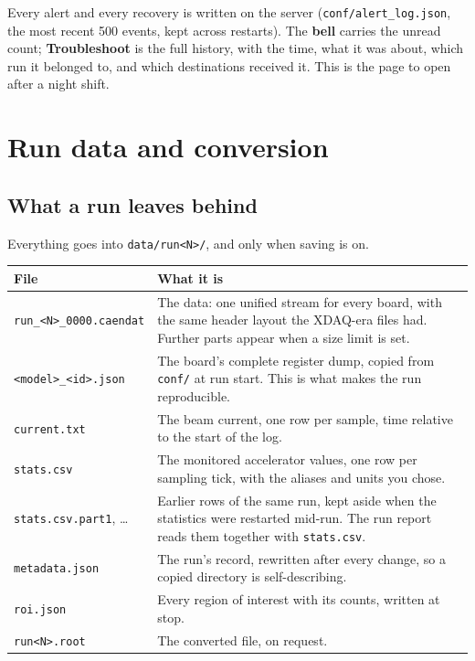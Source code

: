 \documentclass[11pt,a4paper]{report}
\newcommand{\ui}[1]{\textbf{#1}}          %
\newcommand{\file}[1]{\texttt{#1}}
\begin{document}
Every alert and every recovery is written on the server
(\file{conf/alert\_log.json}, the most recent 500 events, kept across restarts).
The \textbf{bell} carries the unread count; \ui{Troubleshoot} is the full history,
with the time, what it was about, which run it belonged to, and which destinations
received it. This is the page to open after a night shift.

\chapter{Run data and conversion}
\label{ch:rundata}

\section{What a run leaves behind}

Everything goes into \file{data/run<N>/}, and only when saving is on.

\begin{center}
\begin{longtable}{@{}L{0.30\textwidth}L{0.62\textwidth}@{}}
\toprule
\textbf{File} & \textbf{What it is} \\
\midrule
\endhead
\file{run\_<N>\_0000.caendat} & The data: one unified stream for every board, with
the same header layout the XDAQ-era files had. Further parts appear when a size
limit is set. \\
\file{<model>\_<id>.json} & The board's complete register dump, copied from
\file{conf/} at run start. This is what makes the run reproducible. \\
\file{current.txt} & The beam current, one row per sample, time relative to the
start of the log. \\
\file{stats.csv} & The monitored accelerator values, one row per sampling tick,
with the aliases and units you chose. \\
\file{stats.csv.part1}, \dots & Earlier rows of the same run, kept aside when the
statistics were restarted mid-run. The run report reads them together with
\file{stats.csv}. \\
\file{metadata.json} & The run's record, rewritten after every change, so a
copied directory is self-describing. \\
\file{roi.json} & Every region of interest with its counts, written at stop. \\
\file{run<N>.root} & The converted file, on request. \\
\bottomrule
\end{longtable}
\end{center}
\end{document}
